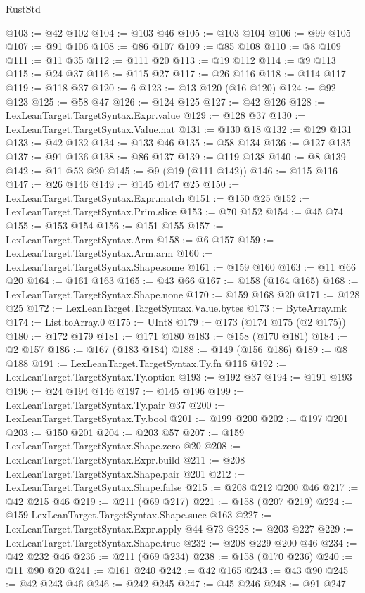 \begin{lexlean}{RustStd}
\begin{coremodule}
{\begin{coremodule}
{{{{{{{{{{{{{{@103 := @42 @102
@104 := @103 @46
@105 := @103 @104
@106 := @99 @105
@107 := @91 @106
@108 := @86 @107
@109 := @85 @108
@110 := @8 @109
@111 := @11 @35
@112 := @111 @20
@113 := @19 @112
@114 := @9 @113
@115 := @24 @37
@116 := @115 @27
@117 := @26 @116
@118 := @114 @117
@119 := @118 @37
@120 := 6
@123 := @13 @120 (@16 @120)
@124 := @92 @123
@125 := @58 @47
@126 := @124 @125
@127 := @42 @126
@128 := LexLeanTarget.TargetSyntax.Expr.value
@129 := @128 @37
@130 := LexLeanTarget.TargetSyntax.Value.nat
@131 := @130 @18
@132 := @129 @131
@133 := @42 @132
@134 := @133 @46
@135 := @58 @134
@136 := @127 @135
@137 := @91 @136
@138 := @86 @137
@139 := @119 @138
@140 := @8 @139
@142 := @11 @53 @20
@145 := @9 (@19 (@111 @142))
@146 := @115 @116
@147 := @26 @146
@149 := @145 @147 @25
@150 := LexLeanTarget.TargetSyntax.Expr.match
@151 := @150 @25
@152 := LexLeanTarget.TargetSyntax.Prim.slice
@153 := @70 @152
@154 := @45 @74
@155 := @153 @154
@156 := @151 @155
@157 := LexLeanTarget.TargetSyntax.Arm
@158 := @6 @157
@159 := LexLeanTarget.TargetSyntax.Arm.arm
@160 := LexLeanTarget.TargetSyntax.Shape.some
@161 := @159 @160
@163 := @11 @66 @20
@164 := @161 @163
@165 := @43 @66
@167 := @158 (@164 @165)
@168 := LexLeanTarget.TargetSyntax.Shape.none
@170 := @159 @168 @20
@171 := @128 @25
@172 := LexLeanTarget.TargetSyntax.Value.bytes
@173 := ByteArray.mk
@174 := List.toArray.{0}
@175 := UInt8
@179 := @173 (@174 @175 (@2 @175))
@180 := @172 @179
@181 := @171 @180
@183 := @158 (@170 @181)
@184 := @2 @157
@186 := @167 (@183 @184)
@188 := @149 (@156 @186)
@189 := @8 @188
@191 := LexLeanTarget.TargetSyntax.Ty.fn @116
@192 := LexLeanTarget.TargetSyntax.Ty.option
@193 := @192 @37
@194 := @191 @193
@196 := @24 @194 @146
@197 := @145 @196
@199 := LexLeanTarget.TargetSyntax.Ty.pair @37
@200 := LexLeanTarget.TargetSyntax.Ty.bool
@201 := @199 @200
@202 := @197 @201
@203 := @150 @201
@204 := @203 @57
@207 := @159 LexLeanTarget.TargetSyntax.Shape.zero @20
@208 := LexLeanTarget.TargetSyntax.Expr.build
@211 := @208 LexLeanTarget.TargetSyntax.Shape.pair @201
@212 := LexLeanTarget.TargetSyntax.Shape.false
@215 := @208 @212 @200 @46
@217 := @42 @215 @46
@219 := @211 (@69 @217)
@221 := @158 (@207 @219)
@224 := @159 LexLeanTarget.TargetSyntax.Shape.succ @163
@227 := LexLeanTarget.TargetSyntax.Expr.apply @44 @73
@228 := @203 @227
@229 := LexLeanTarget.TargetSyntax.Shape.true
@232 := @208 @229 @200 @46
@234 := @42 @232 @46
@236 := @211 (@69 @234)
@238 := @158 (@170 @236)
@240 := @11 @90 @20
@241 := @161 @240
@242 := @42 @165
@243 := @43 @90
@245 := @42 @243 @46
@246 := @242 @245
@247 := @45 @246
@248 := @91 @247
}}}}}}}}}}}}}}
\end{coremodule}}
\end{coremodule}
\end{lexlean}
